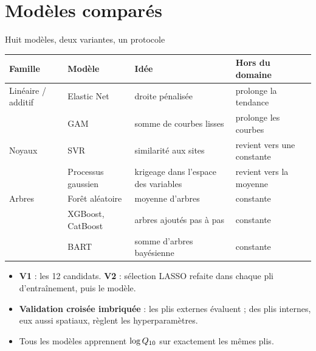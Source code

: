 \documentclass[aspectratio=169,10pt]{beamer}
\newcommand{\Qdix}{Q\textsubscript{10}}
\begin{document}
\section{Modèles comparés}

\begin{frame}{Huit modèles, deux variantes, un protocole}
  \footnotesize
  \begin{tabular}{llll}
    \toprule
    Famille & Modèle & Idée & Hors du domaine \\
    \midrule
    Linéaire / additif & Elastic Net & droite pénalisée & prolonge la tendance \\
                       & GAM & somme de courbes lisses & prolonge les courbes \\
    Noyaux & SVR & similarité aux sites & revient vers une constante \\
           & Processus gaussien & krigeage dans l'espace des variables & revient vers la moyenne \\
    Arbres & Forêt aléatoire & moyenne d'arbres & constante \\
           & XGBoost, CatBoost & arbres ajoutés pas à pas & constante \\
           & BART & somme d'arbres bayésienne & constante \\
    \bottomrule
  \end{tabular}
  \vspace{0.3cm}
  \begin{itemize}
    \item \textbf{V1} : les 12 candidats. \textbf{V2} : sélection LASSO refaite dans chaque pli d'entraînement, puis le modèle.
    \item \textbf{Validation croisée imbriquée} : les plis externes évaluent ; des plis internes, eux aussi spatiaux, règlent les hyperparamètres.
    \item Tous les modèles apprennent $\log\Qdix$ sur exactement les mêmes plis.
  \end{itemize}
\end{frame}
\end{document}
